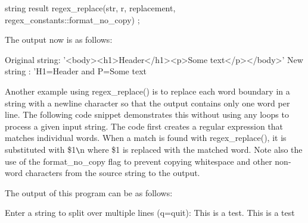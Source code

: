 \begin{cpp}
string result { regex_replace(str, r, replacement,
    regex_constants::format_no_copy) };
\end{cpp}

The output now is as follows:

\begin{shell}
Original string: '<body><h1>Header</h1><p>Some text</p></body>'
New string     : 'H1=Header and P=Some text
\end{shell}

Another example using regex\_replace() is to replace each word boundary in a string with a newline character so that the output contains only one word per line. The following code snippet demonstrates this without using any loops to process a given input string. The code first creates a regular expression that matches individual words. When a match is found with regex\_replace(), it is substituted with \$1\verb|\|n where \$1 is replaced with the matched word. Note also the use of the format\_no\_copy flag to prevent copying whitespace and other non-word characters from the source string to the output.


The output of this program can be as follows:

\begin{shell}
Enter a string to split over multiple lines (q=quit): This is a test.
This
is
a
test
\end{shell}






















